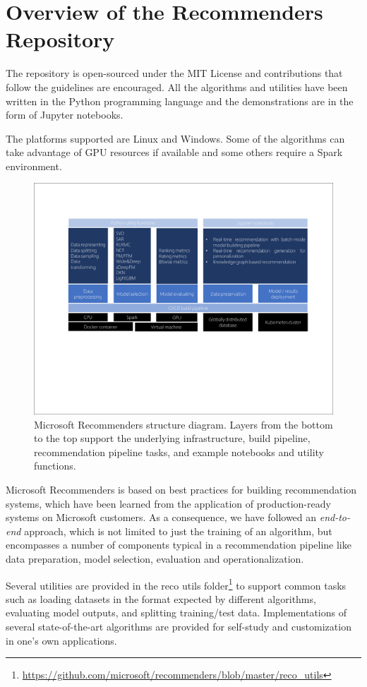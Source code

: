 \section{Overview of the Recommenders Repository}

The repository is open-sourced under the MIT License and contributions that follow the guidelines are encouraged.  
All the algorithms and utilities have been written in the Python programming language and the demonstrations are 
in the form of Jupyter notebooks.

The platforms supported are Linux and Windows. Some of the algorithms can take advantage of GPU resources if available 
and some others require a Spark environment.

\begin{figure}
  \centering
  \includegraphics[width=\textwidth,keepaspectratio]{platform_diagram_crop.pdf}
  \caption{Microsoft Recommenders structure diagram. Layers from the bottom to the top support the underlying 
  infrastructure, build pipeline, recommendation pipeline tasks, and example notebooks and utility functions.}
\end{figure}

Microsoft Recommenders is based on best practices for building recommendation systems, which have been learned from the 
application of production-ready systems on Microsoft customers. As a consequence, we have followed an {\em end-to-end} approach, which 
is not limited to just the training of an algorithm, but encompasses a number of components typical in a 
recommendation pipeline like data preparation, model selection, evaluation and operationalization.

Several utilities are provided in the 
reco utils folder\footnote{\url{https://github.com/microsoft/recommenders/blob/master/reco_utils}} 
to support common tasks such as loading datasets in the format expected by 
different algorithms, evaluating model outputs, and splitting training/test data. 
Implementations of several state-of-the-art algorithms are provided for self-study and 
customization in one's own applications.

